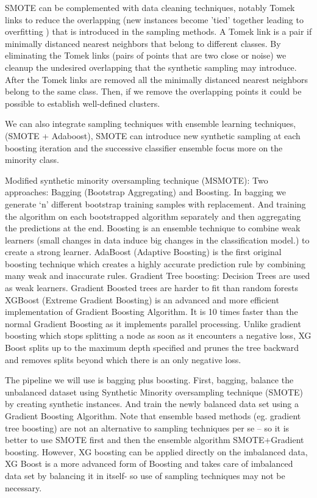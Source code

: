 \documentclass[11pt]{article}
\theoremstyle{definition}
\theoremstyle{remark}
\begin{document}
SMOTE can be complemented with data cleaning techniques, notably Tomek links \cite{tomek1976two} to reduce the overlapping (new instances become 'tied' together leading to overfitting \cite{mease2007boosted}) that is introduced in the sampling methods.
A Tomek link is a pair if minimally distanced nearest neighbors that belong to different classes. By eliminating the Tomek links (pairs of points that are two close or noise) we cleanup the undesired overlapping that the synthetic sampling may introduce. After the Tomek links are removed all the minimally distanced nearest neighbors belong to the same class. Then, if we remove the overlapping points it could be possible to establish well-defined clusters. 

We can also integrate sampling techniques with ensemble learning techniques,  (SMOTE + Adaboost), SMOTE can introduce new synthetic sampling at each boosting iteration and the successive classifier ensemble focus more on the minority class.


Modified synthetic minority oversampling technique (MSMOTE): Two approaches: Bagging (Bootstrap Aggregating) and Boosting. In bagging we generate ‘n’ different bootstrap training samples with replacement. And training the algorithm on each bootstrapped algorithm separately and then aggregating the predictions at the end. 
Boosting is an ensemble technique to combine weak learners (small changes in data induce big changes in the classification model.) to create a strong learner. 
AdaBoost (Adaptive Boosting) is the first original boosting technique which creates a highly accurate prediction rule by combining many weak and inaccurate rules. 
Gradient Tree boosting: Decision Trees are used as weak learners. Gradient Boosted trees are harder to fit than random forests
XGBoost (Extreme Gradient Boosting) is an advanced and more efficient implementation of Gradient Boosting Algorithm. It is 10 times faster than the normal Gradient Boosting as it implements parallel processing. Unlike gradient boosting which stops splitting a node as soon as it encounters a negative loss, XG Boost splits up to the maximum depth specified and prunes the tree backward and removes splits beyond which there is an only negative loss.

The pipeline we will use is bagging plus boosting. First, bagging, balance the unbalanced dataset using Synthetic Minority oversampling technique (SMOTE) by creating synthetic instances. And train the newly balanced data set using a Gradient Boosting Algorithm. Note that ensemble based methods (eg. gradient tree boosting) are not an alternative to sampling techniques per se – so it is better to use SMOTE first and then  the ensemble algorithm SMOTE+Gradient boosting. However, XG boosting can be applied directly on the imbalanced data, XG Boost is a more advanced form of Boosting and takes care of imbalanced data set by balancing it in itself- so use of sampling techniques may not be necessary.
\end{document}
